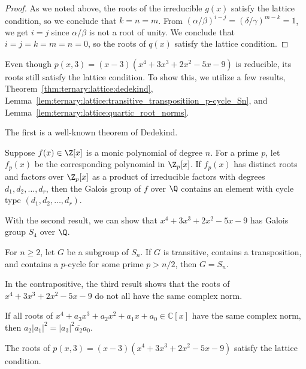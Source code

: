 \documentclass[11pt]{article}
\begin{document}
\begin{proof}
 As we noted above,
 the roots of the irreducible $g(x)$ satisfy the lattice condition,
 so we conclude that $k=n=m$.
 From $(\alpha / \beta)^{i-j} = (\delta / \gamma)^{m-k} = 1$,
 we get $i=j$ since $\alpha / \beta$ is not a root of unity.
 We conclude that $i=j=k=m=n=0$,
 so the roots of $q(x)$ satisfy the lattice condition.
\end{proof}

Even though $p(x,3) = (x - 3) (x^4 + 3 x^3 + 2 x^2 - 5 x - 9)$ is reducible,
its roots still satisfy the lattice condition.
To show this,
we utilize a few results, Theorem~\ref{thm:ternary:lattice:dedekind},
Lemma~\ref{lem:ternary:lattice:transitive_transpositiion_p-cycle_Sn},
and Lemma~\ref{lem:ternary:lattice:quartic_root_norms}.

The first is a well-known theorem of Dedekind.

\begin{theorem} \label{thm:ternary:lattice:dedekind}
 Suppose $f(x) \in \Z[x]$ is a monic polynomial of degree $n$.
 For a prime $p$,
 let $f_p(x)$ be the corresponding polynomial in $\Z_p[x]$.
 If $f_p(x)$ has distinct roots and factors over $\Z_p[x]$ as a product of irreducible factors with degrees $d_1, d_2, \dotsc, d_r$,
 then the Galois group of $f$ over $\Q$ contains an element with cycle type $(d_1, d_2, \dotsc, d_r)$.
\end{theorem}

With the second result,
we can show that $x^4 + 3 x^3 + 2 x^2 - 5 x - 9$ has Galois group $S_4$ over $\Q$.

\begin{lemma} \label{lem:ternary:lattice:transitive_transpositiion_p-cycle_Sn}
 For $n \ge 2$,
 let $G$ be a subgroup of $S_n$.
 If $G$ is transitive, contains a transposition,
 and contains a $p$-cycle for some prime $p > n / 2$,
 then $G = S_n$.
\end{lemma}

In the contrapositive,
the third result shows that the roots of $x^4 + 3 x^3 + 2 x^2 - 5 x - 9$ do not all have the same complex norm.

\begin{lemma} \label{lem:ternary:lattice:quartic_root_norms}
 If all roots of $x^4 + a_3 x^3 + a_2 x^2 + a_1 x + a_0 \in \mathbb{C}[x]$ have the same complex norm,
 then $a_2 |a_1|^2 = |a_3|^2 \overline{a_2} a_0$.
\end{lemma}

\begin{theorem} \label{thm:ternary:lattice:y=3}
 The roots of $p(x,3) = (x - 3) (x^4 + 3 x^3 + 2 x^2 - 5 x - 9)$ satisfy the lattice condition.
\end{theorem}
\end{document}
